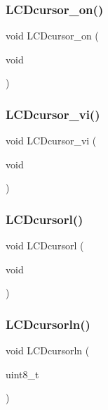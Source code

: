 \subsubsection{L\+C\+Dcursor\+\_\+on()}
{\footnotesize\ttfamily void L\+C\+Dcursor\+\_\+on (\begin{DoxyParamCaption}\item[{void}]{ }\end{DoxyParamCaption})}

\mbox{\label{lcd_8h_a99bb73b2e5d4688dbf86f2d5aaa87484}} 
\subsubsection{L\+C\+Dcursor\+\_\+vi()}
{\footnotesize\ttfamily void L\+C\+Dcursor\+\_\+vi (\begin{DoxyParamCaption}\item[{void}]{ }\end{DoxyParamCaption})}

\mbox{\label{lcd_8h_ae52e7cbae1b62045eb7c97e0751da460}} 
\subsubsection{L\+C\+Dcursorl()}
{\footnotesize\ttfamily void L\+C\+Dcursorl (\begin{DoxyParamCaption}\item[{void}]{ }\end{DoxyParamCaption})}

\mbox{\label{lcd_8h_a5f28989546790c031c97abbb3063ec21}} 
\subsubsection{L\+C\+Dcursorln()}
{\footnotesize\ttfamily void L\+C\+Dcursorln (\begin{DoxyParamCaption}\item[{uint8\+\_\+t}]{ }\end{DoxyParamCaption})}

\mbox{\label{lcd_8h_aceae492825d39eec0d2497f6072b1740}} 
